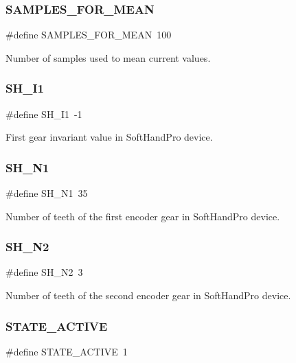\subsubsection{S\+A\+M\+P\+L\+E\+S\+\_\+\+F\+O\+R\+\_\+\+M\+E\+AN}
{\footnotesize\ttfamily \#define S\+A\+M\+P\+L\+E\+S\+\_\+\+F\+O\+R\+\_\+\+M\+E\+AN~100}

Number of samples used to mean current values. \mbox{\label{globals_8h_ac7c2aa0be1a1453f2a25e75f1c7bff16}} 
\subsubsection{S\+H\+\_\+\+I1}
{\footnotesize\ttfamily \#define S\+H\+\_\+\+I1~-\/1}

First gear invariant value in Soft\+Hand\+Pro device. \mbox{\label{globals_8h_af550b25a7e09356fe9fac2773725fa53}} 
\subsubsection{S\+H\+\_\+\+N1}
{\footnotesize\ttfamily \#define S\+H\+\_\+\+N1~35}

Number of teeth of the first encoder gear in Soft\+Hand\+Pro device. \mbox{\label{globals_8h_a20594cbd96a48f93b6b3e0bb8590d15e}} 
\subsubsection{S\+H\+\_\+\+N2}
{\footnotesize\ttfamily \#define S\+H\+\_\+\+N2~3}

Number of teeth of the second encoder gear in Soft\+Hand\+Pro device. \mbox{\label{globals_8h_a695dd637b37252af2a517ba8bae8d2c4}} 
\subsubsection{S\+T\+A\+T\+E\+\_\+\+A\+C\+T\+I\+VE}
{\footnotesize\ttfamily \#define S\+T\+A\+T\+E\+\_\+\+A\+C\+T\+I\+VE~1}


